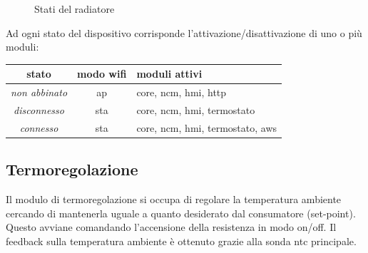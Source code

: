 \documentclass[12pt,a4paper,twoside,titlepage]{book}
\begin{document}
\begin{figure}[ht]
    \centering
    \caption{Stati del radiatore}
    \label{fig:stati}
\end{figure}

Ad ogni stato del dispositivo corrisponde l'attivazione/disattivazione di uno o più
moduli:

\begin{center}
\begin{tabular}{| c | c | l |}
    \hline
    stato & modo \Gls{wifi} & moduli attivi \\ \hline
    \textit{non abbinato} & \acrshort{ap} & core, \acrshort{ncm}, \acrshort{hmi}, \acrshort{http} \\ \hline
    \textit{disconnesso} & \acrshort{sta} & core, \acrshort{ncm}, \acrshort{hmi}, termostato \\ \hline
    \textit{connesso} & \acrshort{sta} & core, \acrshort{ncm}, \acrshort{hmi}, termostato, \acrshort{aws} \\ \hline
\end{tabular}
\end{center}

\subsection{Termoregolazione}

Il modulo di termoregolazione si occupa di regolare la temperatura ambiente cercando di mantenerla
uguale a quanto desiderato dal consumatore (set-point). Questo avviane comandando l'accensione della 
resistenza in modo on/off. Il feedback sulla temperatura ambiente è ottenuto grazie alla sonda \acrshort{ntc} principale.
\end{document}
